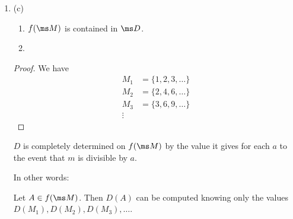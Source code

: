 \begin{enumerate}
\begin{enumerate}[label=(\alph*)]
\begin{enumerate}
\begin{proof}
        Informally, this set consists of a stretch of consecutive integers that are included, followed by a
        longer stretch that are excluded, followed by a longer still stretch that are included, and so on. The
        reason there is no limiting density is that the density fluctuates, and the way in which the stretches
        increase in length means that the amplitude of the density fluctuations does not decrease to zero.

         prove that $D(A) := \lim_{n\to\infty} P_n(A)$ does not exist.
      \end{proof}
    \item
      \begin{claim*}
         $\ms D$ is not closed under finite unions that are not disjoint.
      \end{claim*}
    \end{enumerate}

  \item (c)
    \begin{claim*}
      \begin{enumerate}
      \item $f(\ms M)$ is contained in $\ms D$.
      \item
      \end{enumerate}
    \end{claim*}
    \begin{proof}
      We have
      \begin{align*}
        M_1 &= \{1, 2, 3, \ldots\} \\
        M_2 &= \{2, 4, 6, \ldots\} \\
        M_3 &= \{3, 6, 9, \ldots\} \\
        \vdots
      \end{align*}

    \end{proof}
    \begin{claim*}
      $D$ is completely determined on $f(\ms M)$ by the value it gives for each $a$ to the event that $m$ is
      divisible by $a$.

      In other words:

      Let $A \in f(\ms M)$. Then $D(A)$ can be computed knowing only the values $D(M_1), D(M_2), D(M_3), \ldots$.
    \end{claim*}


\end{enumerate}
\end{enumerate}
